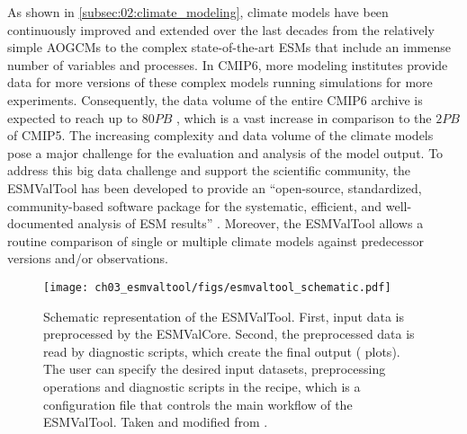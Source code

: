 As shown in \cref{subsec:02:climate_modeling}, climate models have been
continuously improved and extended over the last decades from the relatively
simple \acp{AOGCM} to the complex state-of-the-art \acp{ESM} that include an
immense number of variables and processes. In \acs{CMIP}6, more modeling
institutes provide data for more versions of these complex models running
simulations for more experiments. Consequently, the data volume of the entire
\acs{CMIP}6 archive is expected to reach up to $80 \unit{PB}$
\autocite{Balaji2018}, which is a vast increase in comparison to the $2
\unit{PB}$ of \acs{CMIP}5. The increasing complexity and data volume of the
climate models pose a major challenge for the evaluation and analysis of the
model output. To address this big data challenge and support the scientific
community, the \ac{ESMValTool} has been developed to provide an
\enquote{open-source, standardized, community-based software package for the
  systematic, efficient, and well-documented analysis of \ac{ESM} results}
\autocite{Righi2020}. Moreover, the \ac{ESMValTool} allows a routine comparison
of single or multiple climate models against predecessor versions and/or
observations.

\begin{figure}[t]
  \centering
  \texttt{[image: 
    ch03\_esmvaltool/figs/esmvaltool\_schematic.pdf]}
  \caption{Schematic representation of the \acf{ESMValTool}. First, input data
    is preprocessed by the \acf{ESMValCore}. Second, the preprocessed data is
    read by diagnostic scripts, which create the final output (\eg{} plots).
    The user can specify the desired input datasets, preprocessing operations
    and diagnostic scripts in the recipe, which is a configuration file that
    controls the main workflow of the \acs{ESMValTool}. Taken and modified from
    \textcite{Righi2020}.}
  \label{fig:03:esmvaltool_schematic}
\end{figure}

